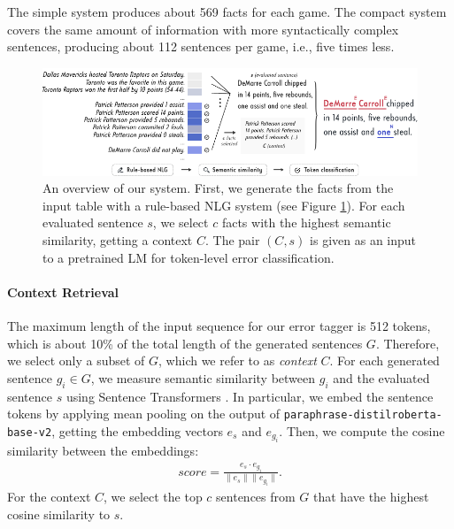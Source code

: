 The simple system produces about 569 facts for each game. The compact system covers the same amount of information with more syntactically complex sentences, producing about 112 sentences per game, i.e., five times less.


\begin{figure}[t]
    \centering
    \includegraphics[width=\textwidth]{img/tok-eval_system.pdf}
    \caption{An overview of our system. First, we generate the facts from the input table with a rule-based NLG system (see Figure \ref{fig:tok-eval:system}). For each evaluated sentence $s$, we select $c$ facts with the highest semantic similarity, getting a context $C$. The pair $(C, s)$ is given as an input to a pretrained LM for token-level error classification.}
    \label{fig:tok-eval:system}
\end{figure}

\paragraph{Context Retrieval} The maximum length of the input sequence for our error tagger is 512 tokens, which is about 10\% of the total length of the generated sentences $G$. Therefore, we select only a subset of $G$, which we refer to as \emph{context} $C$. For each generated sentence $g_i\in G$, we measure semantic similarity between $g_i$ and the evaluated sentence $s$ using Sentence Transformers \cite{reimers-gurevych-2019-sentence}. In particular, we embed the sentence tokens by applying mean pooling on the output of \texttt{paraphrase-distilroberta-base-v2}, getting the embedding vectors $e_{s}$ and $e_{g_i}$. Then, we compute the cosine similarity between the embeddings:
\begin{align}
    score = \frac{e_s \cdot e_{g_i}}{\lVert e_s \rVert \lVert e_{g_i} \rVert}.
\end{align}
For the context $C$, we select the top $c$ sentences from $G$ that have the highest cosine similarity to $s$.



